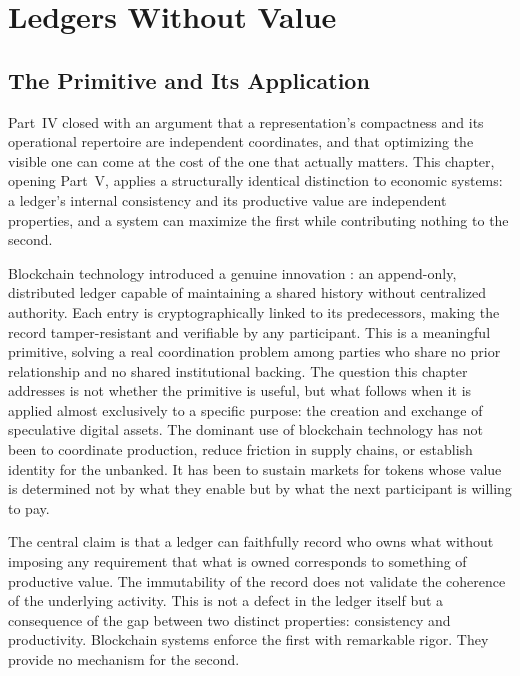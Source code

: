 
\chapter{Ledgers Without Value}
\label{ch:ch19-ledgers-without-value}
\section{The Primitive and Its Application}

Part~IV closed with an argument that a representation's compactness and its operational repertoire are independent coordinates, and that optimizing the visible one can come at the cost of the one that actually matters. This chapter, opening Part~V, applies a structurally identical distinction to economic systems: a ledger's internal consistency and its productive value are independent properties, and a system can maximize the first while contributing nothing to the second.

Blockchain technology introduced a genuine innovation \cite{narayanan2016}: an append-only, distributed ledger capable of maintaining a shared history without centralized authority. Each entry is cryptographically linked to its predecessors, making the record tamper-resistant and verifiable by any participant. This is a meaningful primitive, solving a real coordination problem among parties who share no prior relationship and no shared institutional backing. The question this chapter addresses is not whether the primitive is useful, but what follows when it is applied almost exclusively to a specific purpose: the creation and exchange of speculative digital assets. The dominant use of blockchain technology has not been to coordinate production, reduce friction in supply chains, or establish identity for the unbanked. It has been to sustain markets for tokens whose value is determined not by what they enable but by what the next participant is willing to pay.

The central claim is that a ledger can faithfully record who owns what without imposing any requirement that what is owned corresponds to something of productive value. The immutability of the record does not validate the coherence of the underlying activity. This is not a defect in the ledger itself but a consequence of the gap between two distinct properties: consistency and productivity. Blockchain systems enforce the first with remarkable rigor. They provide no mechanism for the second.

